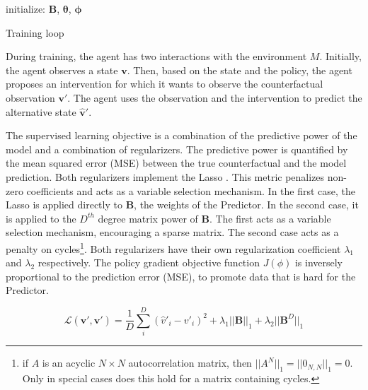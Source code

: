 \documentclass{article}
\begin{document}
\begin{algorithm}
\SetAlgoLined
\LinesNumbered
{}
 initialize: $\mathbf{B}$, $\mathbf{\theta}$, $\mathbf{\phi}$\;
 \caption{Training loop}\label{alg:training_loop}
\end{algorithm}

During training, the agent has two interactions with the environment $M$. Initially, the agent observes a state $\mathbf{v}$. Then, based on the state and the policy, the agent proposes an intervention for which it wants to observe the counterfactual observation $\mathbf{v}'$. The agent uses the observation and the intervention to predict the alternative state $\mathbf{\hat{v}}'$.

The supervised learning objective is a combination of the predictive power of the model and a combination of regularizers. The predictive power is quantified by the mean squared error (MSE) between the true counterfactual and the model prediction. Both regularizers implement the Lasso \cite{tibshirani1996regression}. This metric penalizes non-zero coefficients and acts as a variable selection mechanism. In the first case, the Lasso is applied directly to $\mathbf{B}$, the weights of the Predictor. In the second case, it is applied to the $D^{th}$ degree matrix power of $\mathbf{B}$. The first acts as a variable selection mechanism, encouraging a sparse matrix. The second case acts as a penalty on cycles\footnote{
if $A$ is an acyclic $N \times N$ autocorrelation matrix, then $||A^N||_1=||0_{N,N}||_1=0.$ Only in special cases does this hold for a matrix containing cycles.
}. Both regularizers have their own regularization coefficient $\lambda_1$ and $\lambda_2$ respectively. The policy gradient objective function $J(\phi)$ is inversely proportional to the prediction error (MSE), to promote data that is hard for the Predictor.

\begin{equation}
    \mathcal{L(\hat{\textbf{v}}', \textbf{v}')} = \frac{1}{D} \sum_i^D (\hat{v}'_i - v'_i)^2 + \lambda_1 ||\textbf{B}||_{1} + \lambda_2 ||\textbf{B}^D||_1
\end{equation}
\end{document}
